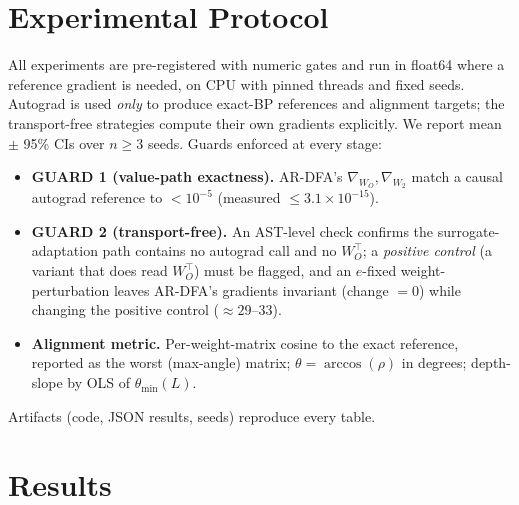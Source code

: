 \documentclass[11pt]{article}
\newcommand{\ARDFA}{\textsc{AR-DFA}}
\begin{document}
\section{Experimental Protocol}\label{sec:protocol}
All experiments are pre-registered with numeric gates and run in float64 where a reference gradient is needed, on CPU with pinned threads and fixed seeds. Autograd is used \emph{only} to produce exact-BP references and alignment targets; the transport-free strategies compute their own gradients explicitly. We report mean $\pm$ 95\% CIs over $n\ge3$ seeds. Guards enforced at every stage:
\begin{itemize}[leftmargin=*,itemsep=2pt]
  \item \textbf{GUARD 1 (value-path exactness).} \ARDFA{}'s $\nabla_{W_O},\nabla_{W_2}$ match a causal autograd reference to $<10^{-5}$ (measured $\le3.1\times10^{-15}$).
  \item \textbf{GUARD 2 (transport-free).} An AST-level check confirms the surrogate-adaptation path contains no autograd call and no $W_O^\top$; a \emph{positive control} (a variant that does read $W_O^\top$) must be flagged, and an $e$-fixed weight-perturbation leaves \ARDFA{}'s gradients invariant (change $=0$) while changing the positive control ($\approx29$--$33$).
  \item \textbf{Alignment metric.} Per-weight-matrix cosine to the exact reference, reported as the worst (max-angle) matrix; $\theta=\arccos(\rho)$ in degrees; depth-slope by OLS of $\theta_{\min}(L)$.
\end{itemize}
Artifacts (code, JSON results, seeds) reproduce every table.

\section{Results}\label{sec:results}
\end{document}
